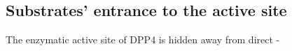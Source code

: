 \subsection{Substrates' entrance to the active site}

The enzymatic active site of DPP4 is hidden away from direct \beta-